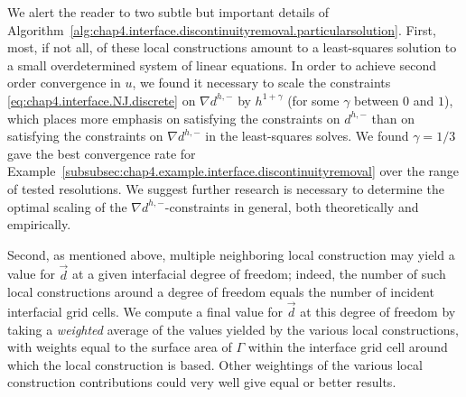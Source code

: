 We alert the reader to two subtle but important details of Algorithm~\ref{alg:chap4.interface.discontinuityremoval.particularsolution}. First, most, if not all, of these local constructions amount to a least-squares solution to a small overdetermined system of linear equations. In order to achieve second order convergence in $u$, we found it necessary to scale the constraints \eqref{eq:chap4.interface.NJ.discrete} on $\nabla d^{h,-}$ by $h^{1+\gamma}$ (for some $\gamma$ between $0$ and $1$), which places more emphasis on satisfying the constraints on $d^{h,-}$ than on satisfying the constraints on $\nabla d^{h,-}$ in the least-squares solves. We found $\gamma = 1/3$ gave the best convergence rate for Example~\ref{subsubsec:chap4.example.interface.discontinuityremoval} over the range of tested resolutions. We suggest further research is necessary to determine the optimal scaling of the $\nabla d^{h,-}$-constraints in general, both theoretically and empirically.

Second, as mentioned above, multiple neighboring local construction may yield a value for $\vec{d}$ at a given interfacial degree of freedom; indeed, the number of such local constructions around a degree of freedom equals the number of incident interfacial grid cells. We compute a final value for $\vec{d}$ at this degree of freedom by taking a \emph{weighted} average of the values yielded by the various local constructions, with weights equal to the surface area of $\Gamma$ within the interface grid cell around which the local construction is based. Other weightings of the various local construction contributions could very well give equal or better results.

